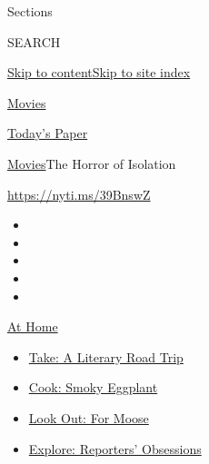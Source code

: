 Sections

SEARCH

\protect\hyperlink{site-content}{Skip to
content}\protect\hyperlink{site-index}{Skip to site index}

\href{https://www.nytimes3xbfgragh.onion/section/movies}{Movies}

\href{https://myaccount.nytimes3xbfgragh.onion/auth/login?response_type=cookie\&client_id=vi}{}

\href{https://www.nytimes3xbfgragh.onion/section/todayspaper}{Today's
Paper}

\href{/section/movies}{Movies}\textbar{}The Horror of Isolation

\url{https://nyti.ms/39BnswZ}

\begin{itemize}
\item
\item
\item
\item
\item
\end{itemize}

\href{https://www.nytimes3xbfgragh.onion/spotlight/at-home?action=click\&pgtype=Article\&state=default\&region=TOP_BANNER\&context=at_home_menu}{At
Home}

\begin{itemize}
\tightlist
\item
  \href{https://www.nytimes3xbfgragh.onion/2020/07/28/books/time-for-a-literary-road-trip.html?action=click\&pgtype=Article\&state=default\&region=TOP_BANNER\&context=at_home_menu}{Take:
  A Literary Road Trip}
\item
  \href{https://www.nytimes3xbfgragh.onion/2020/07/29/magazine/bored-with-your-home-cooking-some-smoky-eggplant-will-fix-that.html?action=click\&pgtype=Article\&state=default\&region=TOP_BANNER\&context=at_home_menu}{Cook:
  Smoky Eggplant}
\item
  \href{https://www.nytimes3xbfgragh.onion/2020/07/27/travel/moose-michigan-isle-royale.html?action=click\&pgtype=Article\&state=default\&region=TOP_BANNER\&context=at_home_menu}{Look
  Out: For Moose}
\item
  \href{https://www.nytimes3xbfgragh.onion/interactive/2020/at-home/even-more-reporters-editors-diaries-lists-recommendations.html?action=click\&pgtype=Article\&state=default\&region=TOP_BANNER\&context=at_home_menu}{Explore:
  Reporters' Obsessions}
\end{itemize}

